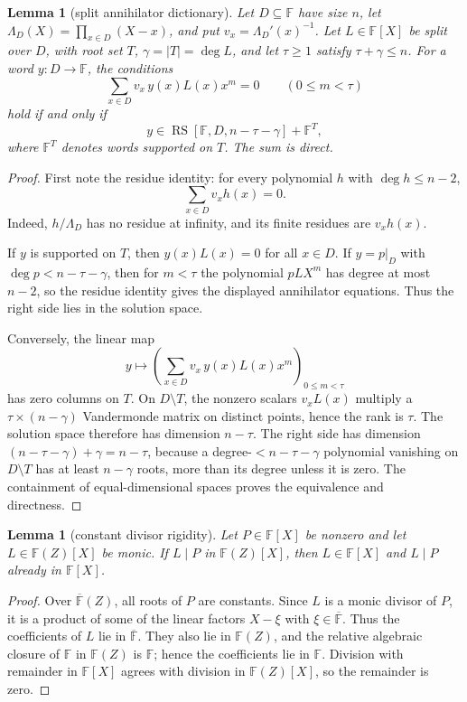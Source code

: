 \documentclass[a4paper,11pt]{amsart}
\newtheorem{lemma}[theorem]{Lemma}
\theoremstyle{remark}
\newcommand{\F}{\mathbb F}
\newcommand{\RS}{\operatorname{RS}}
\begin{document}
\begin{lemma}[split annihilator dictionary]\label{lem:split-annihilator}
Let \(D\subseteq\F\) have size \(n\), let \(\Lambda_D(X)=\prod_{x\in D}(X-x)\), and put \(v_x=\Lambda_D'(x)^{-1}\).  Let \(L\in\F[X]\) be split over \(D\), with root set \(T\), \(\gamma=|T|=\deg L\), and let \(\tau\ge1\) satisfy \(\tau+\gamma\le n\).  For a word \(y:D\to\F\), the conditions
\[
        \sum_{x\in D}v_x\,y(x)L(x)x^m=0
        \qquad(0\le m<\tau)
\]
hold if and only if
\[
        y\in \RS[\F,D,n-\tau-\gamma]+\F^T,
\]
where \(\F^T\) denotes words supported on \(T\).  The sum is direct.
\end{lemma}

\begin{proof}
First note the residue identity: for every polynomial \(h\) with \(\deg h\le n-2\),
\[
        \sum_{x\in D}v_xh(x)=0.
\]
Indeed, \(h/\Lambda_D\) has no residue at infinity, and its finite residues are \(v_xh(x)\).

If \(y\) is supported on \(T\), then \(y(x)L(x)=0\) for all \(x\in D\).  If \(y=p|_D\) with \(\deg p<n-\tau-\gamma\), then for \(m<\tau\) the polynomial \(pLX^m\) has degree at most \(n-2\), so the residue identity gives the displayed annihilator equations.  Thus the right side lies in the solution space.

Conversely, the linear map
\[
        y\longmapsto
        \left(\sum_{x\in D}v_x\,y(x)L(x)x^m\right)_{0\le m<\tau}
\]
has zero columns on \(T\).  On \(D\setminus T\), the nonzero scalars \(v_xL(x)\) multiply a \(\tau\times(n-\gamma)\) Vandermonde matrix on distinct points, hence the rank is \(\tau\).  The solution space therefore has dimension \(n-\tau\).  The right side has dimension \((n-\tau-\gamma)+\gamma=n-\tau\), because a degree-\(<n-\tau-\gamma\) polynomial vanishing on \(D\setminus T\) has at least \(n-\gamma\) roots, more than its degree unless it is zero.  The containment of equal-dimensional spaces proves the equivalence and directness.
\end{proof}

\begin{lemma}[constant divisor rigidity]\label{lem:constant-divisor}
Let \(P\in\F[X]\) be nonzero and let \(L\in\F(Z)[X]\) be monic.  If \(L\mid P\) in \(\F(Z)[X]\), then \(L\in\F[X]\) and \(L\mid P\) already in \(\F[X]\).
\end{lemma}

\begin{proof}
Over \(\overline{\F}(Z)\), all roots of \(P\) are constants.  Since \(L\) is a monic divisor of \(P\), it is a product of some of the linear factors \(X-\xi\) with \(\xi\in\overline{\F}\).  Thus the coefficients of \(L\) lie in \(\overline{\F}\).  They also lie in \(\F(Z)\), and the relative algebraic closure of \(\F\) in \(\F(Z)\) is \(\F\); hence the coefficients lie in \(\F\).  Division with remainder in \(\F[X]\) agrees with division in \(\F(Z)[X]\), so the remainder is zero.
\end{proof}
\end{document}
